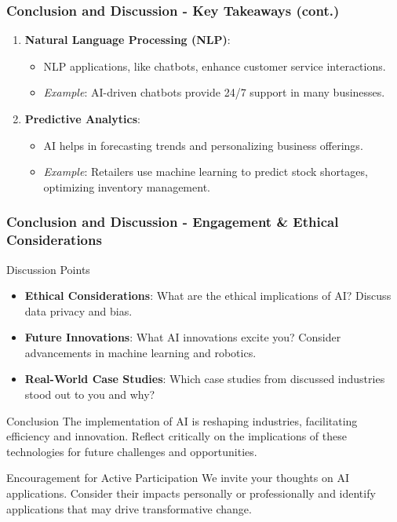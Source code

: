 \documentclass{beamer}
\begin{document}
\begin{frame}[fragile]
    \frametitle{Conclusion and Discussion - Key Takeaways (cont.)}
    \begin{enumerate}[resume]
        \item \textbf{Natural Language Processing (NLP)}: 
            \begin{itemize}
                \item NLP applications, like chatbots, enhance customer service interactions.
                \item \textit{Example}: AI-driven chatbots provide 24/7 support in many businesses.
            \end{itemize}
        
        \item \textbf{Predictive Analytics}: 
            \begin{itemize}
                \item AI helps in forecasting trends and personalizing business offerings.
                \item \textit{Example}: Retailers use machine learning to predict stock shortages, optimizing inventory management.
            \end{itemize}
    \end{enumerate}
\end{frame}

\begin{frame}[fragile]
    \frametitle{Conclusion and Discussion - Engagement & Ethical Considerations}
    \begin{block}{Discussion Points}
        \begin{itemize}
            \item \textbf{Ethical Considerations}: 
                What are the ethical implications of AI? Discuss data privacy and bias.
            \item \textbf{Future Innovations}: 
                What AI innovations excite you? Consider advancements in machine learning and robotics.
            \item \textbf{Real-World Case Studies}: 
                Which case studies from discussed industries stood out to you and why?
        \end{itemize}
    \end{block}
    
    \begin{block}{Conclusion}
        The implementation of AI is reshaping industries, facilitating efficiency and innovation. Reflect critically on the implications of these technologies for future challenges and opportunities.
    \end{block}

    \begin{block}{Encouragement for Active Participation}
        We invite your thoughts on AI applications. Consider their impacts personally or professionally and identify applications that may drive transformative change.
    \end{block}
\end{frame}
\end{document}
